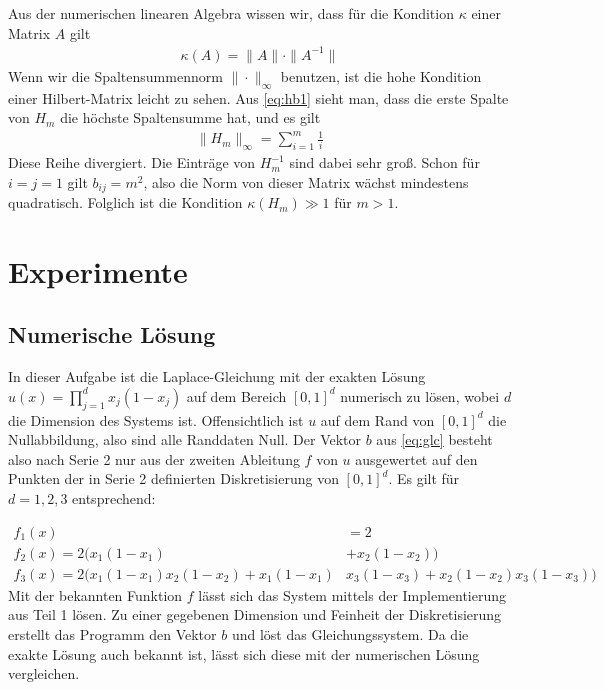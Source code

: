 \documentclass[smallheadings]{scrartcl}
\numberwithin{equation}{section}
\begin{document}
Aus der numerischen linearen Algebra wissen wir, dass für die Kondition $\kappa$ einer Matrix $A$ gilt
\begin{align}
	\kappa(A)=\|A\|\cdot \|A^{-1}\|
\end{align}
Wenn wir die Spaltensummennorm $\|\cdot \|_{\infty}$ benutzen, ist die hohe Kondition einer Hilbert-Matrix leicht zu sehen. Aus \ref{eq:hb1}  sieht man, dass die erste Spalte von $H_m$ die höchste Spaltensumme hat, und es gilt
\begin{align}
	\|H_m\|_{\infty}=\sum_{i=1}^{m}\frac{1}{i}
\end{align}
Diese Reihe divergiert. Die Einträge von $H_m^{-1}$ sind dabei sehr groß. Schon für $i=j=1$ gilt $b_{ij} = m^2$, also die Norm von dieser Matrix wächst mindestens quadratisch. Folglich ist die Kondition $\kappa(H_m)\gg1$ für $m>1$.


\section{Experimente}

\subsection{Numerische Lösung}

In dieser Aufgabe ist die Laplace-Gleichung mit der exakten Lösung $u(x)=\prod_{j=1}^{d}x_j(1-x_j)$ auf dem Bereich $[0, 1]^d$ numerisch zu lösen, wobei $d$ die Dimension des Systems ist. Offensichtlich ist $u$ auf dem Rand von $[0, 1]^d$ die Nullabbildung, also sind alle Randdaten Null. Der Vektor $b$ aus \ref{eq:glc} besteht also nach Serie 2 nur aus der zweiten Ableitung $f$ von $u$ ausgewertet auf den Punkten der in Serie 2 definierten Diskretisierung von $[0, 1]^d$. Es gilt für $d=1, 2, 3$ entsprechend:

\begin{align}
f_1(x)&=2 \\
f_2(x) = 2(x_1(1-x_1)&+x_2(1-x_2)) \\
f_3(x)= 2(x_1(1-x_1)x_2(1-x_2)+x_1(1-x_1)&x_3(1-x_3)+x_2(1-x_2)x_3(1-x_3))
\end{align}
Mit der bekannten Funktion $f$ lässt sich das System mittels der Implementierung aus Teil 1 lösen. Zu einer gegebenen Dimension und Feinheit der Diskretisierung erstellt das Programm den Vektor $b$ und löst das Gleichungssystem. Da die exakte Lösung auch bekannt ist, lässt sich diese mit der numerischen Lösung vergleichen.
\end{document}
